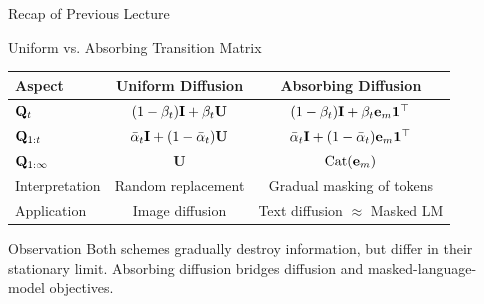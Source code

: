 \documentclass{beamer}
\begin{document}
\begin{frame}{Recap of Previous Lecture}
	\begin{block}{Uniform vs. Absorbing Transition Matrix}
        \begin{table}[h!]
            \centering
            \small
            \begin{tabular}{lcc}
                \toprule
                \textbf{Aspect} & \textbf{Uniform Diffusion} & \textbf{Absorbing Diffusion} \\
                \midrule
                $\mathbf{Q}_t$
                    & $(1-\beta_t)\mathbf{I} + \beta_t \mathbf{U}$ 
                    & $(1-\beta_t)\mathbf{I} + \beta_t \mathbf{e}_m\mathbf{1}^\top$ \\[4pt]
                $\mathbf{Q}_{1:t}$
                    & $\bar\alpha_t \mathbf{I} + (1-\bar\alpha_t)\mathbf{U}$
                    & $\bar\alpha_t \mathbf{I} + (1-\bar\alpha_t)\mathbf{e}_m\mathbf{1}^\top$ \\[4pt]
                $\mathbf{Q}_{1:\infty}$
                    & $\mathbf{U}$
                    & $\operatorname{Cat}(\mathbf{e}_m)$ \\[4pt]
                Interpretation
                    & Random replacement
                    & Gradual masking of tokens \\[4pt]
                Application
                    & Image diffusion
                    & Text diffusion $\approx$ Masked LM \\[4pt]
                \bottomrule
            \end{tabular}
        \end{table}
    \end{block}
	\begin{block}{Observation}
		Both schemes gradually destroy information, but differ in their stationary limit.
		Absorbing diffusion bridges diffusion and masked-language-model objectives.
	\end{block}
\end{frame}
\end{document}
